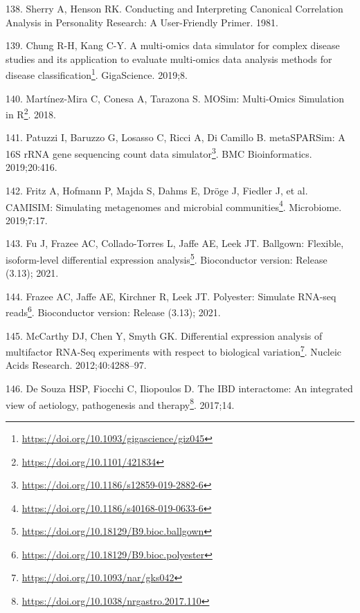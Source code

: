 \documentclass[
  12pt,
  a4paper,
  twoside,
  openright]{book}
\DeclareRobustCommand{\href}[2]{#2\footnote{\url{#1}}}
\newlength{\cslhangindent}
\newlength{\cslentryspacingunit} %
\newenvironment{CSLReferences}[2] %
 {%
  \setlength{\parindent}{0pt}
  \ifodd #1
  \let\oldpar\par
  \def\par{\hangindent=\cslhangindent\oldpar}
  \fi
  \setlength{\parskip}{#2\cslentryspacingunit}
 }%
 {}
\begin{document}
\begin{CSLReferences}{0}{0}
\leavevmode{}%
138. Sherry A, Henson RK. Conducting and {Interpreting Canonical Correlation Analysis} in {Personality Research}: {A User}-{Friendly Primer}. 1981.

\leavevmode{}%
139. Chung R-H, Kang C-Y. \href{https://doi.org/10.1093/gigascience/giz045}{A multi-omics data simulator for complex disease studies and its application to evaluate multi-omics data analysis methods for disease classification}. GigaScience. 2019;8.

\leavevmode{}%
140. Martínez-Mira C, Conesa A, Tarazona S. \href{https://doi.org/10.1101/421834}{MOSim: Multi-Omics Simulation in R}. 2018.

\leavevmode{}%
141. Patuzzi I, Baruzzo G, Losasso C, Ricci A, Di Camillo B. \href{https://doi.org/10.1186/s12859-019-2882-6}{metaSPARSim: A 16S rRNA gene sequencing count data simulator}. BMC Bioinformatics. 2019;20:416.

\leavevmode{}%
142. Fritz A, Hofmann P, Majda S, Dahms E, Dröge J, Fiedler J, et al. \href{https://doi.org/10.1186/s40168-019-0633-6}{CAMISIM: Simulating metagenomes and microbial communities}. Microbiome. 2019;7:17.

\leavevmode{}%
143. Fu J, Frazee AC, Collado-Torres L, Jaffe AE, Leek JT. \href{https://doi.org/10.18129/B9.bioc.ballgown}{Ballgown: Flexible, isoform-level differential expression analysis}. Bioconductor version: Release (3.13); 2021.

\leavevmode{}%
144. Frazee AC, Jaffe AE, Kirchner R, Leek JT. \href{https://doi.org/10.18129/B9.bioc.polyester}{Polyester: Simulate RNA-seq reads}. Bioconductor version: Release (3.13); 2021.

\leavevmode{}%
145. McCarthy DJ, Chen Y, Smyth GK. \href{https://doi.org/10.1093/nar/gks042}{Differential expression analysis of multifactor RNA-Seq experiments with respect to biological variation}. Nucleic Acids Research. 2012;40:4288--97.

\leavevmode{}%
146. De Souza HSP, Fiocchi C, Iliopoulos D. \href{https://doi.org/10.1038/nrgastro.2017.110}{The {IBD} interactome: {An} integrated view of aetiology, pathogenesis and therapy}. 2017;14.


\end{CSLReferences}
\end{document}
